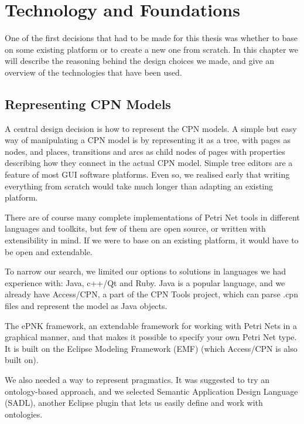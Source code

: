 \chapter{Technology and Foundations}
\label{chap:technology}

One of the first decisions that had to be made for this thesis was whether to
base \thename{} on some existing platform or to create a new one from
scratch. In this chapter we will describe the reasoning behind the
design choices we made, and give an overview of the technologies that have been
used.

\section{Representing CPN Models}
	
	A central design decision is how to represent the CPN models. A simple
	but easy way of manipulating a CPN model is by representing it as a tree, with pages as
	nodes, and places, transitions and arcs as child nodes of pages with properties
	describing how they connect in the actual CPN model.
	Simple tree editors are a feature of most GUI software platforms.
	Even so, we realised early that writing everything from scratch would take
	much longer than adapting an existing platform.

	There are of course many complete implementations of Petri Net tools in
	different languages and toolkits, but few of them are open source, or written
	with extensibility in mind. If we were to base \thename{} on an existing
	platform, it would have to be open and extendable. 
	
	To narrow our search, we limited our options to solutions in
	languages we had experience with: Java, c++/Qt and Ruby. Java is a popular
	language, and we already have Access/CPN, a part of the CPN Tools project,
	which can parse .cpn files and represent the model as Java objects. 
	
	The ePNK framework, an extendable framework for working with Petri Nets in a
	graphical manner, and that makes it possible to specify your own Petri Net
	type. It is built on the Eclipse Modeling Framework (EMF) (which Access/CPN is
	also built on).
	
	We also needed a way to represent pragmatics. It was suggested to try an
	ontology-based approach, and we selected Semantic Application Design Language
	(SADL), another Eclipse plugin that lets us easily define and work with ontologies.
	
	
